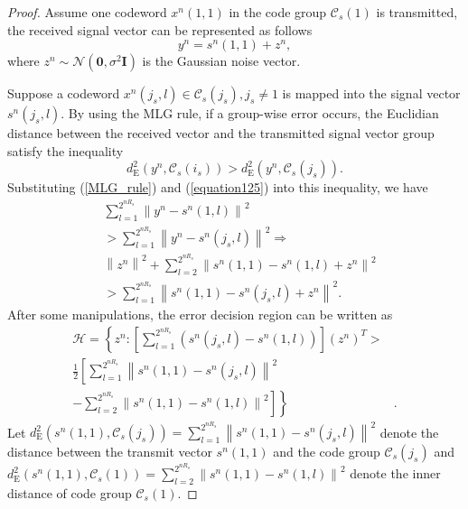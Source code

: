 \documentclass[12pt, draftclsnofoot,onecolumn]{IEEEtran}
\begin{document}
\begin{proof}
Assume one codeword $x^n(1,1)$ in the code group $\mathcal{C}_s(1)$ is transmitted, the received signal vector can be represented as follows
\begin{equation}\label{equation125}
y^n=s^n(1,1)+z^n,
\end{equation}
where $z^n \sim \mathcal{N}(\mathbf{0},\sigma^2\mathbf{I})$ is the Gaussian noise vector.

Suppose a codeword $x^n(j_s,l)\in \mathcal{C}_s(j_s), j_s\neq 1$ is mapped into the signal vector $s^n(j_s,l)$. By using the MLG rule, if a group-wise error occurs, the Euclidian distance between the received vector and the transmitted signal vector group satisfy the inequality
\begin{equation}
d_{\text{E}}^2 \left(y^n, \mathcal{C}_s(i_s)\right)>d_{\text{E}}^2 \left(y^n, \mathcal{C}_s(j_s)\right).
\end{equation}
Substituting (\ref{MLG_rule}) and (\ref{equation125}) into this inequality, we have
\begin{equation}
\begin{aligned}
&\sum_{l=1}^{2^{nR_s}} \left\|y^n-s^n(1,l)\right\|^2\\
&>\sum_{l=1}^{2^{nR_s}} \left\|y^n-s^n(j_s,l)\right\|^2 \Rightarrow\\
&\left\|z^n\right\|^2+\sum_{l=2}^{2^{nR_s}} \left\|s^n(1,1)-s^n(1,l)+z^n\right\|^2\\
&>\sum_{l=1}^{2^{nR_s}} \left\|s^n(1,1)-s^n(j_s,l)+z^n\right\|^2.
\end{aligned}
\end{equation}
After some manipulations, the error decision region can be written as
\begin{equation}
\begin{aligned}
\mathcal{H}= \left\{ z^n:  \left[\sum_{l=1}^{2^{nR_s}} \left(s^n(j_s,l)-s^n(1,l)\right)\right] (z^n)^T >\right. &\\
  \frac{1}{2}\left[\sum_{l=1}^{2^{nR_s}} \left\|s^n(1,1)-s^n(j_s,l)\right\|^2\right.&\\
  \left. \left.-\sum_{l=2}^{2^{nR_s}} \left\|s^n(1,1)-s^n(1,l)\right\|^2\right]\right\}&.
\end{aligned}
\end{equation}
Let $d_{\text{E}}^2 \left(s^n(1,1), \mathcal{C}_s(j_s)\right)=\sum_{l=1}^{2^{nR_s}} \left\|s^n(1,1)-s^n(j_s,l)\right\|^2$ denote the distance between the transmit vector $s^n(1,1)$ and the code group $\mathcal{C}_s(j_s)$ and $d_{\text{E}}^2 \left(s^n(1,1), \mathcal{C}_s(1)\right)=\sum_{l=2}^{2^{nR_s}} \left\|s^n(1,1)-s^n(1,l)\right\|^2$ denote the inner distance of code group $\mathcal{C}_s(1)$.


\end{proof}
\end{document}
